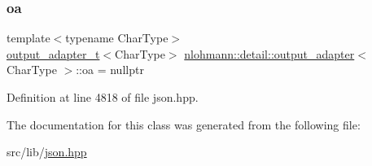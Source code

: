 \subsubsection{\texorpdfstring{oa}{oa}}
{\footnotesize\ttfamily template$<$typename Char\+Type$>$ \\
\hyperlink{namespacenlohmann_1_1detail_a9b680ddfb58f27eb53a67229447fc556}{output\+\_\+adapter\+\_\+t}$<$Char\+Type$>$ \hyperlink{classnlohmann_1_1detail_1_1output__adapter}{nlohmann\+::detail\+::output\+\_\+adapter}$<$ Char\+Type $>$\+::oa = nullptr\hspace{0.3cm}{\ttfamily [private]}}



Definition at line 4818 of file json.\+hpp.



The documentation for this class was generated from the following file\+:\begin{DoxyCompactItemize}
\item 
src/lib/\hyperlink{json_8hpp}{json.\+hpp}\end{DoxyCompactItemize}
